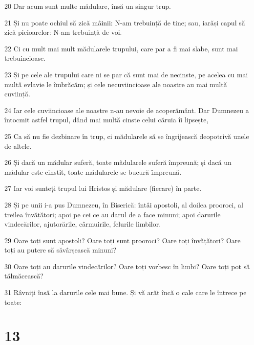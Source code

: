 \par 20 Dar acum sunt multe mădulare, însă un singur trup.
\par 21 Și nu poate ochiul să zică mâinii: N-am trebuință de tine; sau, iarăși capul să zică picioarelor: N-am trebuință de voi.
\par 22 Ci cu mult mai mult mădularele trupului, care par a fi mai slabe, sunt mai trebuincioase.
\par 23 Și pe cele ale trupului care ni se par că sunt mai de necinste, pe acelea cu mai multă evlavie le îmbrăcăm; și cele necuviincioase ale noastre au mai multă cuviință.
\par 24 Iar cele cuviincioase ale noastre n-au nevoie de acoperământ. Dar Dumnezeu a întocmit astfel trupul, dând mai multă cinste celui căruia îi lipsește,
\par 25 Ca să nu fie dezbinare în trup, ci mădularele să se îngrijească deopotrivă unele de altele.
\par 26 Și dacă un mădular suferă, toate mădularele suferă împreună; și dacă un mădular este cinstit, toate mădularele se bucură împreună.
\par 27 Iar voi sunteți trupul lui Hristos și mădulare (fiecare) în parte.
\par 28 Și pe unii i-a pus Dumnezeu, în Biserică: întâi apostoli, al doilea prooroci, al treilea învățători; apoi pe cei ce au darul de a face minuni; apoi darurile vindecărilor, ajutorările, cârmuirile, felurile limbilor.
\par 29 Oare toți sunt apostoli? Oare toți sunt prooroci? Oare toți învățători? Oare toți au putere să săvârșească minuni?
\par 30 Oare toți au darurile vindecărilor? Oare toți vorbesc în limbi? Oare toți pot să tălmăcească?
\par 31 Râvniți însă la darurile cele mai bune. Și vă arăt încă o cale care le întrece pe toate:

\chapter{13}


